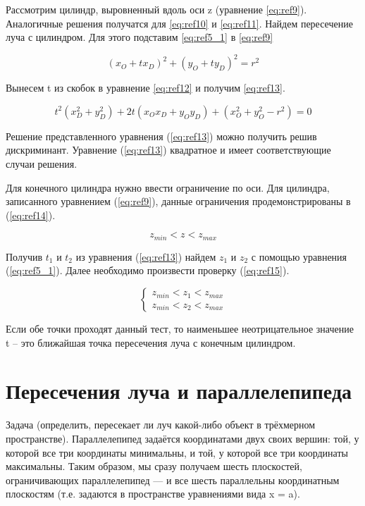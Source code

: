 Рассмотрим цилиндр, выровненный вдоль оси z (уравнение \ref{eq:ref9}).
Аналогичные решения получатся для \eqref{eq:ref10} и \eqref{eq:ref11}.
Найдем пересечение луча с цилиндром.
Для этого подставим \eqref{eq:ref5_1} в \eqref{eq:ref9}

\begin{equation}
	(x_O + t x_D)^2 + (y_O + t y_D)^2 = r^2
	\label{eq:ref12}
\end{equation}

Вынесем t из скобок в уравнение \eqref{eq:ref12} и получим \eqref{eq:ref13}.

\begin{equation}
	t^2(x_D^2+y_D^2) + 2t(x_Ox_D + y_Oy_D) + (x_O^2 + y_O^2 - r^2) = 0
	\label{eq:ref13}
\end{equation}

Решение представленного уравнения (\ref{eq:ref13}) можно получить решив дискриминант.
Уравнение (\ref{eq:ref13}) квадратное и имеет соответствующие случаи решения.


Для конечного цилиндра нужно ввести ограничение по оси.
Для цилиндра, записанного уравнением (\ref{eq:ref9}), данные ограничения
продемонстрированы в (\ref{eq:ref14}).

\begin{equation}
	z_{min} < z < z_{max}
	\label{eq:ref14}
\end{equation}

Получив $t_1$ и $t_2$ из уравнения (\ref{eq:ref13})
найдем $z_1$ и $z_2$ с помощью уравнения (\ref{eq:ref5_1}).
Далее необходимо произвести проверку (\ref{eq:ref15}).

\begin{equation}
	{\begin{cases}
			z_{min} < z_1 < z_{max} \\
			z_{min} < z_2 < z_{max}
			\label{eq:ref15}
	\end{cases}}
\end{equation}

Если обе точки проходят данный тест, то наименьшее неотрицательное
значение t -- это ближайшая точка пересечения луча с конечным цилиндром.

\section{Пересечения луча и параллелепипеда}

Задача (определить, пересекает ли луч какой-либо объект в трёхмерном пространстве). Параллелепипед задаётся координатами двух своих вершин: той, у которой все три координаты минимальны, и той, у которой все три координаты максимальны. 
Таким образом, мы сразу получаем шесть плоскостей, ограничивающих параллелепипед --- и все шесть параллельны координатным плоскостям (т.е. задаются в пространстве уравнениями вида x = a).


